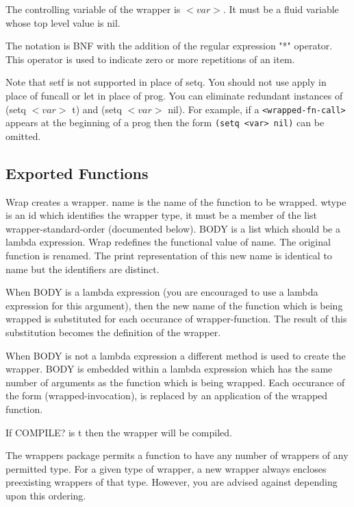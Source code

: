 The  controlling variable of the wrapper is $<var>$. It must be
a fluid variable whose top level value is nil.

The notation is BNF with the addition of the regular
expression "*" operator. This operator is used to indicate zero
or more repetitions of an item.

  Note  that setf is not supported in place of setq.  You should
not use apply in place of funcall or let in place of prog.   You
can  eliminate  redundant  instances of (setq $<var>$ t) and (setq
$<var>$ nil).  For example, if a \verb+<wrapped-fn-call>+ appears at the
beginning of a prog then the
form \verb+(setq <var> nil)+ can be
omitted.

\subsection{Exported Functions}


{    Wrap creates a wrapper.  name is the name of the function to
    be wrapped.  wtype is an id  which  identifies  the  wrapper
    type, it must be a member of the list wrapper-standard-order
    (documented below).  BODY is a list which should be a lambda
    expression.
}
    Wrap  redefines  the functional value of name.  The original
    function is renamed.  The print representation of  this  new
    name is identical to name but the identifiers are distinct.

    When  BODY is a lambda expression (you are encouraged to use
    a lambda expression for this argument), then the new name of
    the function which is being wrapped is substituted for  each
    occurance   of   wrapper-function.    The   result  of  this
    substitution becomes the definition of the wrapper.

    When BODY is not a lambda expression a different  method  is
    used  to  create  the  wrapper.    BODY is embedded within a
    lambda expression which has the same number of arguments  as
    the  function which is being wrapped.  Each occurance of the
    form (wrapped-invocation), is replaced by an application  of
    the wrapped function.

    If COMPILE? is t then the wrapper will be compiled.

    The  wrappers  package permits a function to have any number
    of wrappers of any permitted type.   For  a  given  type  of
    wrapper,  a new wrapper always encloses preexisting wrappers
    of that type.  However, you are  advised  against  depending
    upon this ordering.


